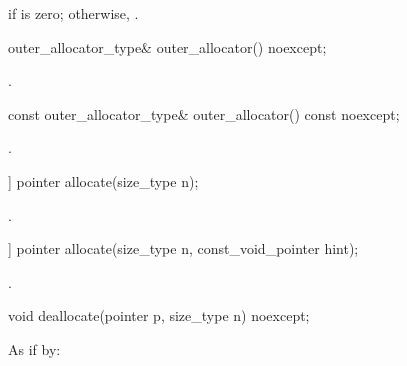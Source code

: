 \begin{itemdescr}
\pnum
\returns {} if  is zero; otherwise,
.
\end{itemdescr}

%
\begin{itemdecl}
outer_allocator_type& outer_allocator() noexcept;
\end{itemdecl}

\begin{itemdescr}
\pnum
\returns {}.
\end{itemdescr}

%
\begin{itemdecl}
const outer_allocator_type& outer_allocator() const noexcept;
\end{itemdecl}

\begin{itemdescr}
\pnum
\returns {}.
\end{itemdescr}

%
\begin{itemdecl}
[[nodiscard]] pointer allocate(size_type n);
\end{itemdecl}

\begin{itemdescr}
\pnum
\returns {}.
\end{itemdescr}

%
\begin{itemdecl}
[[nodiscard]] pointer allocate(size_type n, const_void_pointer hint);
\end{itemdecl}

\begin{itemdescr}
\pnum
\returns {}.
\end{itemdescr}

%
\begin{itemdecl}
void deallocate(pointer p, size_type n) noexcept;
\end{itemdecl}

\begin{itemdescr}
\pnum
\effects As if by:
\end{itemdescr}


